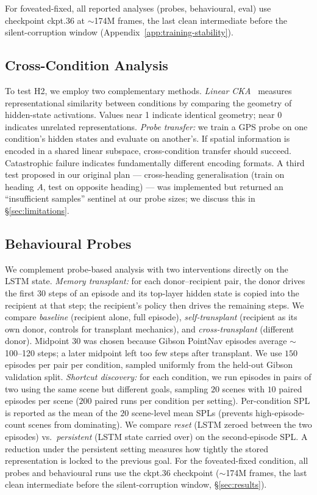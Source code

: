 \documentclass{article}
\begin{document}
For foveated-fixed, all reported analyses (probes, behavioural, eval) use checkpoint ckpt.36 at $\sim$174M frames, the last clean intermediate before the silent-corruption window (Appendix~\ref{app:training-stability}).

\subsection{Cross-Condition Analysis}

To test H2, we employ two complementary methods. \emph{Linear CKA}~\citep{kornblith2019cka} measures representational similarity between conditions by comparing the geometry of hidden-state activations. Values near 1 indicate identical geometry; near 0 indicates unrelated representations. \emph{Probe transfer:} we train a GPS probe on one condition's hidden states and evaluate on another's. If spatial information is encoded in a shared linear subspace, cross-condition transfer should succeed. Catastrophic failure indicates fundamentally different encoding formats. A third test proposed in our original plan --- cross-heading generalisation (train on heading $A$, test on opposite heading) --- was implemented but returned an ``insufficient samples'' sentinel at our probe sizes; we discuss this in §\ref{sec:limitations}.

\subsection{Behavioural Probes}
\label{sec:methods-behav}
We complement probe-based analysis with two interventions directly on the LSTM state. \emph{Memory transplant:} for each donor--recipient pair, the donor drives the first $30$ steps of an episode and its top-layer hidden state is copied into the recipient at that step; the recipient's policy then drives the remaining steps. We compare \emph{baseline} (recipient alone, full episode), \emph{self-transplant} (recipient as its own donor, controls for transplant mechanics), and \emph{cross-transplant} (different donor). Midpoint $30$ was chosen because Gibson PointNav episodes average $\sim$100--120 steps; a later midpoint left too few steps after transplant. We use $150$ episodes per pair per condition, sampled uniformly from the held-out Gibson validation split. \emph{Shortcut discovery:} for each condition, we run episodes in pairs of two using the same scene but different goals, sampling $20$ scenes with $10$ paired episodes per scene ($200$ paired runs per condition per setting). Per-condition SPL is reported as the mean of the $20$ scene-level mean SPLs (prevents high-episode-count scenes from dominating). We compare \emph{reset} (LSTM zeroed between the two episodes) vs.\ \emph{persistent} (LSTM state carried over) on the second-episode SPL. A reduction under the persistent setting measures how tightly the stored representation is locked to the previous goal. For the foveated-fixed condition, all probes and behavioural runs use the ckpt.36 checkpoint ($\sim$174M frames, the last clean intermediate before the silent-corruption window, §\ref{sec:results}).
\end{document}
